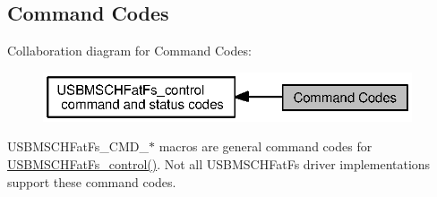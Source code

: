 \subsection{Command Codes}
\label{group___u_s_b_m_s_c_h_fat_fs___c_m_d}
Collaboration diagram for Command Codes\+:
\nopagebreak
\begin{figure}[H]
\begin{center}
\leavevmode
\includegraphics[width=309pt]{group___u_s_b_m_s_c_h_fat_fs___c_m_d}
\end{center}
\end{figure}
U\+S\+B\+M\+S\+C\+H\+Fat\+Fs\+\_\+\+C\+M\+D\+\_\+$\ast$ macros are general command codes for \hyperlink{_u_s_b_m_s_c_h_fat_fs_8h_a8725aac569cefabe624b5bfda0d07422}{U\+S\+B\+M\+S\+C\+H\+Fat\+Fs\+\_\+control()}. Not all U\+S\+B\+M\+S\+C\+H\+Fat\+Fs driver implementations support these command codes. 